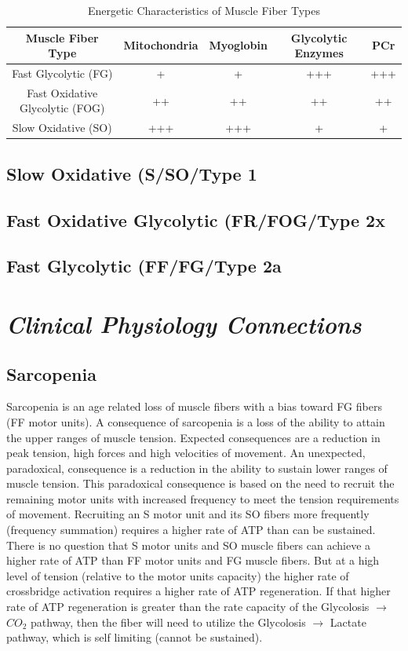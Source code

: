 \begin{table}[h!]
\centering
\begin{tabular}{||c c c c c||} 
 \hline
 Muscle Fiber Type & Mitochondria & Myoglobin & Glycolytic Enzymes & PCr \\ [0.5ex] 
 \hline\hline
 Fast Glycolytic (FG)  & + & + & +++ & +++ \\ 
 Fast Oxidative Glycolytic (FOG) & ++ & ++ & ++ & ++ \\
 Slow Oxidative (SO) &  +++ & +++ & + & + \\ [1ex] 
 \hline
\end{tabular}
\caption{Energetic Characteristics of Muscle Fiber Types}
\label{table:Muscle_Fiber_Energetics}
\end{table}

\subsection{Slow Oxidative (S/SO/Type 1}

\subsection{Fast Oxidative Glycolytic (FR/FOG/Type 2x}

\subsection{Fast Glycolytic (FF/FG/Type 2a}




\section{\textit{Clinical Physiology Connections}}

\subsection{Sarcopenia}

Sarcopenia is an age related loss of muscle fibers with a bias toward FG fibers (FF motor units). A consequence of sarcopenia is a loss of the ability to attain the upper ranges of muscle tension. Expected consequences are a reduction in peak tension, high forces and high velocities of movement. An unexpected, paradoxical, consequence is a reduction in the ability to sustain lower ranges of muscle tension. This paradoxical consequence is based on the need to recruit the remaining motor units with increased frequency to meet the tension requirements of movement. Recruiting an S motor unit and its SO fibers more frequently (frequency summation) requires a higher rate of ATP than can be sustained. There is no question that S motor units and SO muscle fibers can achieve a higher rate of ATP than FF motor units and FG muscle fibers. But at a high level of tension (relative to the motor units capacity) the higher rate of crossbridge activation requires a higher rate of ATP regeneration. If that higher rate of ATP regeneration is greater than the rate capacity of the Glycolosis $\rightarrow$ $CO_2$ pathway, then the fiber will need to utilize the Glycolosis $\rightarrow$ Lactate pathway, which is self limiting (cannot be sustained). 

